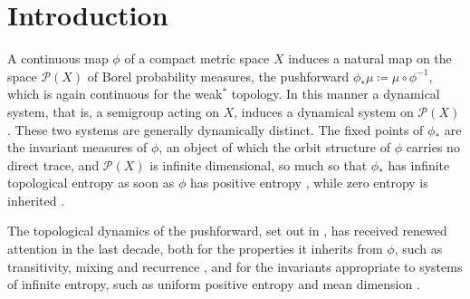 \documentclass[11pt,reqno]{amsart}
\theoremstyle{plain}
\theoremstyle{definition}
\newcommand{\Prob}{\mathcal{P}}
\begin{document}

\raggedbottom
\maketitle	
\tableofcontents

\pagebreak

\section{Introduction}
    \label{sec:introduction}
A continuous map \( \phi \) of a compact metric space \( X \) induces a natural map on the space \( \Prob(X) \) of Borel probability measures, the pushforward \( \phi_\ast\mu\coloneqq\mu\circ\phi^{-1} \), which is again continuous for the weak\( ^\ast \) topology.
In this manner a dynamical system, that is, a semigroup acting on \( X \), induces a dynamical system on \( \Prob(X) \).
These two systems are generally dynamically distinct.
The fixed points of \( \phi_\ast \) are the invariant measures of \( \phi \), an object of which the orbit structure of \( \phi \) carries no direct trace, and \( \Prob(X) \) is infinite dimensional, so much so that \( \phi_\ast \) has infinite topological entropy as soon as \( \phi \) has positive entropy \cite{bauer_topological_1975}, while zero entropy is inherited \cite{glasner_quasi-factors_1995}.

The topological dynamics of the pushforward, set out in \cite{bauer_topological_1975,glasner_quasi-factors_1995}, has received renewed attention in the last decade, both for the properties it inherits from \( \phi \), such as transitivity, mixing and recurrence \cite{baraviera_dynamics_2013,li_recurrence_2015,bernardes_dynamics_2016}, and for the invariants appropriate to systems of infinite entropy, such as uniform positive entropy and mean dimension \cite{bernardes_uniformly_2022,liu_relative_2023,lopes_level-2_2024,vermersch_measure-theoretic_2024,burguet_topological_2025}.
\end{document}
